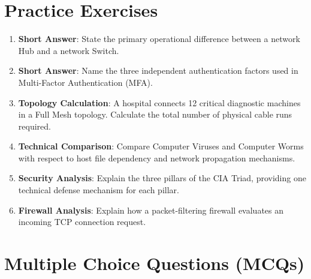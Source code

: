 \section{Practice Exercises}

\begin{practiceset}
\begin{enumerate}[leftmargin=1.5em]
    \item \textbf{Short Answer}: State the primary operational difference between a network Hub and a network Switch.
    \item \textbf{Short Answer}: Name the three independent authentication factors used in Multi-Factor Authentication (MFA).
    \item \textbf{Topology Calculation}: A hospital connects 12 critical diagnostic machines in a Full Mesh topology. Calculate the total number of physical cable runs required.
    \item \textbf{Technical Comparison}: Compare Computer Viruses and Computer Worms with respect to host file dependency and network propagation mechanisms.
    \item \textbf{Security Analysis}: Explain the three pillars of the CIA Triad, providing one technical defense mechanism for each pillar.
    \item \textbf{Firewall Analysis}: Explain how a packet-filtering firewall evaluates an incoming TCP connection request.
\end{enumerate}
\end{practiceset}

\section{Multiple Choice Questions (MCQs)}


